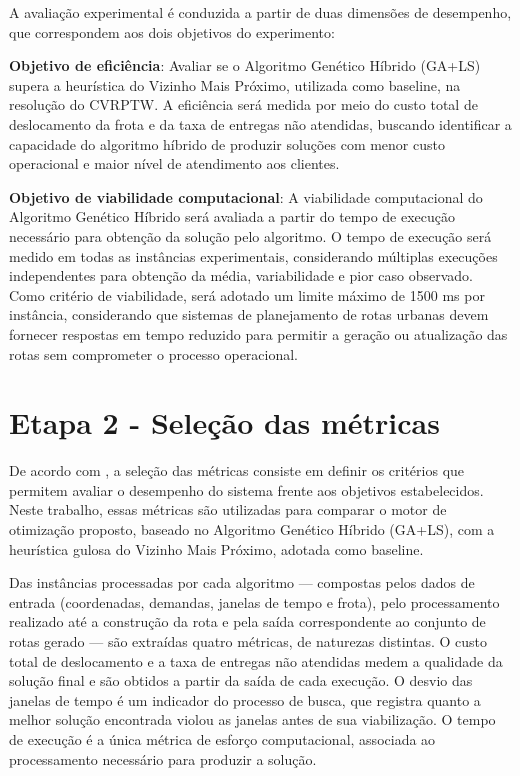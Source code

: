 A avaliação experimental é conduzida a partir de duas dimensões de desempenho, que
correspondem aos dois objetivos do experimento:

\begin{alineas}
	\item \textbf{Objetivo de eficiência}: Avaliar se o Algoritmo Genético Híbrido
	(GA+LS) supera a heurística do Vizinho Mais Próximo, utilizada como baseline, na
	resolução do CVRPTW. A eficiência será medida por meio do custo total de
	deslocamento da frota e da taxa de entregas não atendidas, buscando identificar a
	capacidade do algoritmo híbrido de produzir soluções com menor custo operacional e
	maior nível de atendimento aos clientes.

	\item \textbf{Objetivo de viabilidade computacional}: A viabilidade computacional do
	Algoritmo Genético Híbrido será avaliada a partir do tempo de execução necessário
	para obtenção da solução pelo algoritmo. O tempo de execução será medido em todas
	as instâncias experimentais, considerando múltiplas execuções independentes para
	obtenção da média, variabilidade e pior caso observado. Como critério de
	viabilidade, será adotado um limite máximo de 1500 ms por instância, considerando
	que sistemas de planejamento de rotas urbanas devem fornecer respostas em tempo
	reduzido para permitir a geração ou atualização das rotas sem comprometer o
	processo operacional.
\end{alineas}

\section{Etapa 2 - Seleção das métricas}
\label{sec:etapa2}

De acordo com , a seleção das métricas consiste em definir os
critérios que permitem avaliar o desempenho do sistema frente aos objetivos
estabelecidos. Neste trabalho, essas métricas são utilizadas para comparar o motor de
otimização proposto, baseado no Algoritmo Genético Híbrido (GA+LS), com a heurística
gulosa do Vizinho Mais Próximo, adotada como baseline.

Das instâncias processadas por cada algoritmo --- compostas pelos dados de entrada
(coordenadas, demandas, janelas de tempo e frota), pelo processamento realizado até a
construção da rota e pela saída correspondente ao conjunto de rotas gerado --- são
extraídas quatro métricas, de naturezas distintas. O custo total de deslocamento e a
taxa de entregas não atendidas medem a qualidade da solução final e são obtidos a
partir da saída de cada execução. O desvio das janelas de tempo é um indicador do
processo de busca, que registra quanto a melhor solução encontrada violou as janelas
antes de sua viabilização. O tempo de execução é a única métrica de esforço
computacional, associada ao processamento necessário para produzir a solução.


